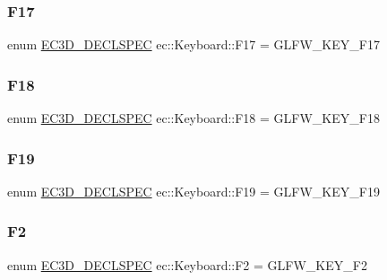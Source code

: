 \mbox{\label{classec_1_1_keyboard_a18122e1ed0e95e748ad31caab2ae8708}} 
\subsubsection{\texorpdfstring{F17}{F17}}
{\footnotesize\ttfamily enum \mbox{\hyperlink{_common_8h_aac42573e202ca3dd4d259c81691e2369}{E\+C3\+D\+\_\+\+D\+E\+C\+L\+S\+P\+EC}} ec\+::\+Keyboard\+::\+F17 = G\+L\+F\+W\+\_\+\+K\+E\+Y\+\_\+\+F17}

\mbox{\label{classec_1_1_keyboard_ab3daea4415ff472d2b508d1b253090d2}} 
\subsubsection{\texorpdfstring{F18}{F18}}
{\footnotesize\ttfamily enum \mbox{\hyperlink{_common_8h_aac42573e202ca3dd4d259c81691e2369}{E\+C3\+D\+\_\+\+D\+E\+C\+L\+S\+P\+EC}} ec\+::\+Keyboard\+::\+F18 = G\+L\+F\+W\+\_\+\+K\+E\+Y\+\_\+\+F18}

\mbox{\label{classec_1_1_keyboard_ab48cdd8c5bf4b8e47564af59678b660d}} 
\subsubsection{\texorpdfstring{F19}{F19}}
{\footnotesize\ttfamily enum \mbox{\hyperlink{_common_8h_aac42573e202ca3dd4d259c81691e2369}{E\+C3\+D\+\_\+\+D\+E\+C\+L\+S\+P\+EC}} ec\+::\+Keyboard\+::\+F19 = G\+L\+F\+W\+\_\+\+K\+E\+Y\+\_\+\+F19}

\mbox{\label{classec_1_1_keyboard_a039646ad1000430fd7bcdf04b2c91ec7}} 
\subsubsection{\texorpdfstring{F2}{F2}}
{\footnotesize\ttfamily enum \mbox{\hyperlink{_common_8h_aac42573e202ca3dd4d259c81691e2369}{E\+C3\+D\+\_\+\+D\+E\+C\+L\+S\+P\+EC}} ec\+::\+Keyboard\+::\+F2 = G\+L\+F\+W\+\_\+\+K\+E\+Y\+\_\+\+F2}

